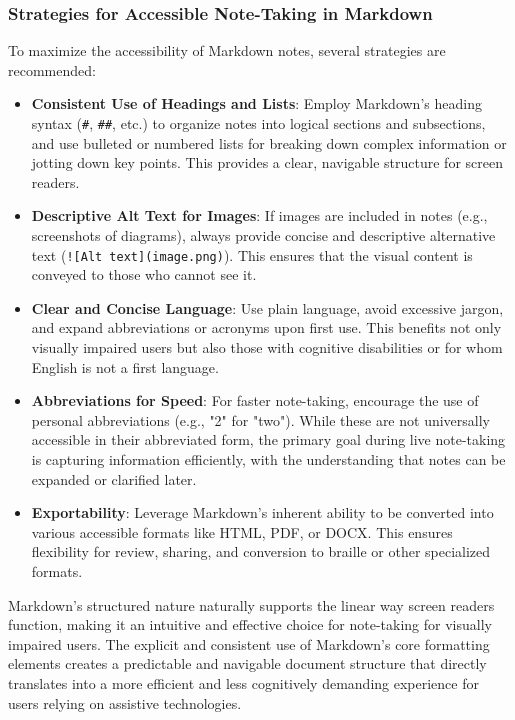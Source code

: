 \subsubsection{Strategies for Accessible Note-Taking in Markdown}

To maximize the accessibility of Markdown notes, several strategies are recommended:

\begin{itemize}
    \item \textbf{Consistent Use of Headings and Lists}: Employ Markdown's heading syntax (\texttt{\#}, \texttt{\#\#}, etc.) to organize notes into logical sections and subsections, and use bulleted or numbered lists for breaking down complex information or jotting down key points. \cite{MSPowerShellMarkdown, TeachingVI} This provides a clear, navigable structure for screen readers.
    \item \textbf{Descriptive Alt Text for Images}: If images are included in notes (e.g., screenshots of diagrams), always provide concise and descriptive alternative text (\texttt{![Alt text](image.png)}). This ensures that the visual content is conveyed to those who cannot see it. \cite{GitLabDocs, MarkdownToolbox}
    \item \textbf{Clear and Concise Language}: Use plain language, avoid excessive jargon, and expand abbreviations or acronyms upon first use. This benefits not only visually impaired users but also those with cognitive disabilities or for whom English is not a first language. \cite{MDNHTML, MSPowerShellMarkdown}
    \item \textbf{Abbreviations for Speed}: For faster note-taking, encourage the use of personal abbreviations (e.g., "2" for "two"). \cite{PerkinsMonsterNote} While these are not universally accessible in their abbreviated form, the primary goal during live note-taking is capturing information efficiently, with the understanding that notes can be expanded or clarified later.
    \item \textbf{Exportability}: Leverage Markdown's inherent ability to be converted into various accessible formats like HTML, PDF, or DOCX. \cite{Inkdrop, Bear, CreateUW} This ensures flexibility for review, sharing, and conversion to braille or other specialized formats.
\end{itemize}

Markdown's structured nature naturally supports the linear way screen readers function, making it an intuitive and effective choice for note-taking for visually impaired users. The explicit and consistent use of Markdown's core formatting elements creates a predictable and navigable document structure that directly translates into a more efficient and less cognitively demanding experience for users relying on assistive technologies.


